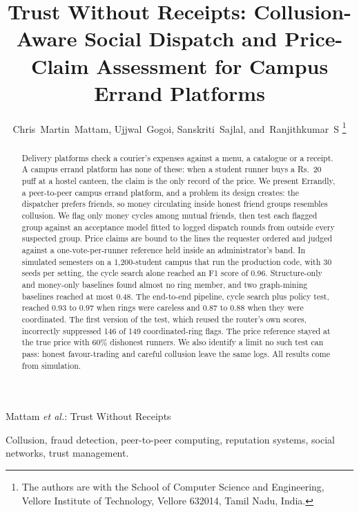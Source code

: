 \documentclass[journal]{IEEEtran}
\begin{document}
\title{Trust Without Receipts: Collusion-Aware Social Dispatch and Price-Claim Assessment for Campus Errand Platforms}

\author{Chris~Martin~Mattam,
        Ujjwal~Gogoi,
        Sanskriti~Sajlal,
        and~Ranjithkumar~S%
\thanks{The authors are with the School of Computer Science and Engineering,
Vellore Institute of Technology, Vellore 632014, Tamil Nadu, India.}%
}

%
{Mattam \MakeLowercase{\textit{et al.}}: Trust Without Receipts}

\maketitle

\begin{abstract}
Delivery platforms check a courier's expenses against a menu, a catalogue or a
receipt. A campus errand platform has none of these: when a student runner buys a
Rs.~20 puff at a hostel canteen, the claim is the only record of the price. We
present Errandly, a peer-to-peer campus errand platform, and a problem its design
creates: the dispatcher prefers friends, so money circulating inside honest friend
groups resembles collusion. We flag only money cycles among mutual
friends, then test each flagged group against an acceptance model fitted to logged
dispatch rounds from outside every suspected group. Price claims are bound to the
lines the requester ordered and judged against a one-vote-per-runner reference held
inside an administrator's band. In simulated semesters on a 1,200-student campus
that run the production code, with 30 seeds per setting, the cycle search alone
reached an F1 score of 0.96. Structure-only and money-only baselines found almost no
ring member, and two graph-mining baselines reached at most 0.48. The end-to-end pipeline, cycle search plus policy test,
reached 0.93 to 0.97 when rings were careless and 0.87 to 0.88 when they were
coordinated. The first version of the test, which reused the router's own scores,
incorrectly suppressed 146 of 149 coordinated-ring flags. The price reference stayed
at the true price with 60\% dishonest runners. We also identify a limit no such test
can pass: honest favour-trading and careful collusion leave the same logs. All
results come from simulation.
\end{abstract}

\begin{IEEEkeywords}
Collusion, fraud detection, peer-to-peer computing, reputation systems, social
networks, trust management.
\end{IEEEkeywords}
\end{document}
